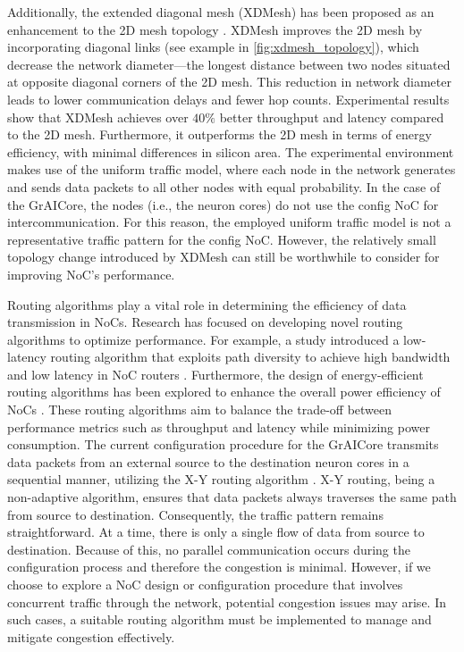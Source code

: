 Additionally, the extended diagonal mesh (XDMesh) has been proposed as an enhancement to the 2D mesh topology \cite{furhadExtendedDiagonalMesh2015}.
XDMesh improves the 2D mesh by incorporating diagonal links (see example in \cref{fig:xdmesh_topology}), which decrease the network diameter---the longest distance between two nodes situated at opposite diagonal corners of the 2D mesh.
This reduction in network diameter leads to lower communication delays and fewer  hop counts.
Experimental results show that XDMesh achieves over $40\%$ better throughput and latency compared to the 2D mesh.
Furthermore, it outperforms the 2D mesh in terms of energy efficiency, with minimal differences in silicon area.
The experimental environment makes use of the uniform traffic model, where each node in the network generates and sends data packets to all other nodes with equal probability.
In the case of the GrAICore, the nodes (i.e., the neuron cores) do not use the config NoC for intercommunication.
For this reason, the employed uniform traffic model is not a representative traffic pattern for the config NoC. 
However, the relatively small topology change introduced by XDMesh can still be worthwhile to consider for improving NoC's performance.

Routing algorithms play a vital role in determining the efficiency of data transmission in NoCs.
Research has focused on developing novel routing algorithms to optimize performance.
For example, a study introduced a low-latency routing algorithm that exploits path diversity to achieve high bandwidth and low latency in NoC routers \cite{yangExploitingPathDiversity2012}.
Furthermore, the design of energy-efficient routing algorithms has been explored to enhance the overall power efficiency of NoCs \cite{parikhPowerAwareNoCsRouting2014}.
These routing algorithms aim to balance the trade-off between performance metrics such as throughput and latency while minimizing power consumption.
The current configuration procedure for the GrAICore transmits data packets from an external source to the destination neuron cores in a sequential manner, utilizing the X-Y routing algorithm \cite{glassTurnModelAdaptive1992}.
X-Y routing, being a non-adaptive algorithm, ensures that data packets always traverses the same path from source to destination.
Consequently, the traffic pattern remains straightforward.
At a time, there is only a single flow of data from source to destination.
Because of this, no parallel communication occurs during the configuration process and therefore the congestion is minimal.
However, if we choose to explore a NoC design or configuration procedure that involves concurrent traffic through the network, potential congestion issues may arise.
In such cases, a suitable routing algorithm must be implemented to manage and mitigate congestion effectively.

